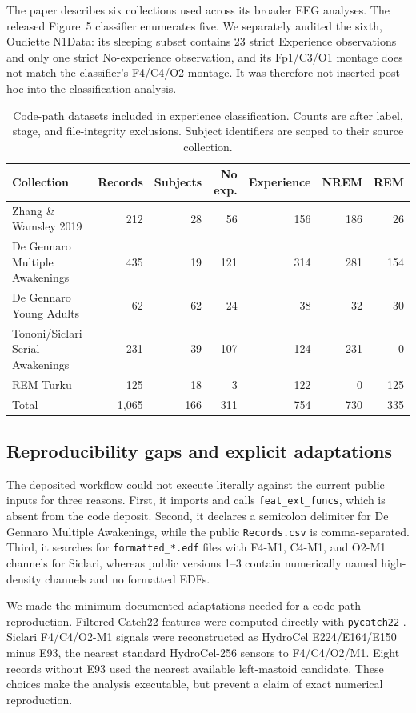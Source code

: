 \documentclass[10pt,twocolumn]{article}
\newcommand{\code}[1]{\texttt{#1}}
\begin{document}
The paper describes six collections used across its broader EEG analyses. The
released Figure~5 classifier enumerates five. We separately audited the sixth,
Oudiette N1Data: its sleeping subset contains 23 strict Experience observations
and only one strict No-experience observation, and its Fp1/C3/O1 montage does
not match the classifier's F4/C4/O2 montage. It was therefore not inserted
post hoc into the classification analysis.

\begin{table}[t]
\centering
\caption{Code-path datasets included in experience classification. Counts are
after label, stage, and file-integrity exclusions. Subject identifiers are
scoped to their source collection.}
\label{tab:data}
\begin{tabular}{lrrrrrr}
\toprule
Collection & Records & Subjects & No exp. & Experience & NREM & REM \\
\midrule
Zhang \& Wamsley 2019 & 212 & 28 & 56 & 156 & 186 & 26 \\
De Gennaro Multiple Awakenings & 435 & 19 & 121 & 314 & 281 & 154 \\
De Gennaro Young Adults & 62 & 62 & 24 & 38 & 32 & 30 \\
Tononi/Siclari Serial Awakenings & 231 & 39 & 107 & 124 & 231 & 0 \\
REM Turku & 125 & 18 & 3 & 122 & 0 & 125 \\
\midrule
Total & 1,065 & 166 & 311 & 754 & 730 & 335 \\
\bottomrule
\end{tabular}
\end{table}

\subsection{Reproducibility gaps and explicit adaptations}

The deposited workflow could not execute literally against the current public
inputs for three reasons. First, it imports and calls \code{feat\_ext\_funcs},
which is absent from the code deposit. Second, it declares a semicolon delimiter
for De Gennaro Multiple Awakenings, while the public \code{Records.csv} is
comma-separated. Third, it searches for \code{formatted\_*.edf} files with
F4-M1, C4-M1, and O2-M1 channels for Siclari, whereas public versions 1--3
contain numerically named high-density channels and no formatted EDFs.

We made the minimum documented adaptations needed for a code-path
reproduction. Filtered Catch22 features were computed directly with
\code{pycatch22} \citep{lubba2019catch22}. Siclari F4/C4/O2-M1 signals were
reconstructed as HydroCel E224/E164/E150 minus E93, the nearest standard
HydroCel-256 sensors to F4/C4/O2/M1. Eight records without E93 used the nearest
available left-mastoid candidate. These choices make the analysis executable,
but prevent a claim of exact numerical reproduction.
\end{document}

